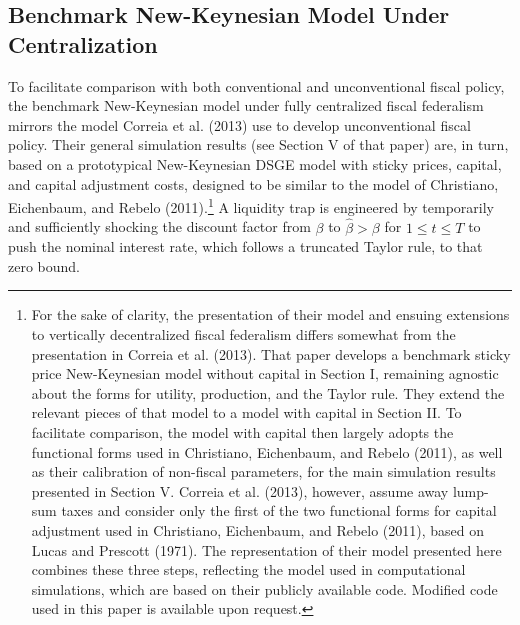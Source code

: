 \documentclass[12pt,letterpaper]{article}
\begin{document}
\subsection{Benchmark New-Keynesian Model Under Centralization}
To facilitate comparison with both conventional and unconventional fiscal policy, the benchmark New-Keynesian model under fully centralized fiscal federalism mirrors the model Correia et al. (2013) use to develop unconventional fiscal policy. Their general simulation results (see Section V of that paper) are, in turn, based on a prototypical New-Keynesian DSGE model with sticky prices, capital, and capital adjustment costs, designed to be similar to the model of Christiano, Eichenbaum, and Rebelo (2011).\footnote{For the sake of clarity, the presentation of their model and ensuing extensions to vertically decentralized fiscal federalism differs somewhat from the presentation in Correia et al. (2013). That paper develops a benchmark sticky price New-Keynesian model without capital in Section I, remaining agnostic about the forms for utility, production, and the Taylor rule. They extend the relevant pieces of that model to a model with capital in Section II. To facilitate comparison, the model with capital then largely adopts the functional forms used in Christiano, Eichenbaum, and Rebelo (2011), as well as their calibration of non-fiscal parameters, for the main simulation results presented in Section V. Correia et al. (2013), however,  assume away lump-sum taxes and consider only the first of the two functional forms for capital adjustment used in Christiano, Eichenbaum, and Rebelo (2011), based on Lucas and Prescott (1971). The representation of their model presented here combines these three steps, reflecting the model used in computational simulations, which are based on their publicly available code. Modified code used in this paper is available upon request.} A liquidity trap is engineered by temporarily and sufficiently shocking the discount factor from $\beta$ to $\hat{\beta} > \beta$ for $ 1 \leq t \leq T$ to push the nominal interest rate, which follows a truncated Taylor rule, to that zero bound. 
\end{document}
